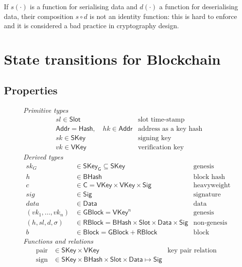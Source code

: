 \documentclass[11pt,a4paper]{article}
\newcommand{\type}[1]{\mathsf{#1}}
\newcommand{\Hash}{\type{Hash}}    %
\newcommand{\BHash}{\type{BHash}}  %
\newcommand{\Addr}{\type{Addr}}
\newcommand{\Slot}{\type{Slot}}
\newcommand{\GBlock}{\type{GBlock}}
\newcommand{\RBlock}{\type{RBlock}}
\newcommand{\Block}{\type{Block}}
\newcommand{\HCert}{\type{C}}
\newcommand{\SKey}{\type{SKey}}
\newcommand{\SKeyGen}{\type{SKey_G}}
\newcommand{\VKey}{\type{VKey}}
\newcommand{\Sig}{\type{Sig}}
\newcommand{\Data}{\type{Data}}
\newcommand{\signname}{sign}
\newcommand{\keypairname}{pair}
\begin{document}
If $s(\cdot)$ is a function for serialising data and $d(\cdot)$ a function for
deserialising data, their composition $s \circ d$ is not an identity function:
this is hard to enforce and it is considered a bad practice in cryptography
design.

\section{State transitions for Blockchain}
\label{sec:state-trans-chain}

\subsection{Properties}
\label{sec:chain-properties}

\begin{figure}[h]
  \emph{Primitive types}
  \begin{align*}
    & sl \in \Slot & \text{slot time-stamp}\\
    & \Addr = \Hash,\quad hk \in \Addr & \text{address as a key hash}\\
    & sk \in \SKey & \text{signing key}\\
    & vk \in \VKey & \text{verification key}
  \end{align*}
  \emph{Derived types}
  \begin{align*}
    sk_G & \in \SKeyGen \subseteq \SKey & \text{genesis block's signing key}\\
    h & \in \BHash & \text{block hash}\\
    c & \in \HCert = \VKey \times \VKey \times \Sig & \text{heavyweight delegation certificate}\\
    sig & \in \Sig  & \text{signature}\\
    data & \in \Data  & \text{data}\\
    (vk_1, \dotsc, vk_n) & \in \GBlock = \VKey^n & \text{genesis block} \\
    (h, sl, d, \sigma) & \in \RBlock = \BHash \times \Slot \times \Data \times \Sig
      & \text{non-genesis block} \\
    b & \in \Block = \GBlock + \RBlock & \text{block}
  \end{align*}
  \emph{Functions and relations}
  \begin{align*}
    \text{\keypairname} & \in \SKey \times \VKey & \text{key pair relation}\\
    \text{\signname} & \in \SKey \times \BHash \times \Slot \times \Data \mapsto \Sig

\end{align*}
\end{figure}
\end{document}
